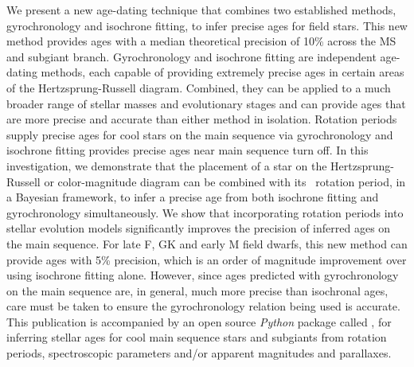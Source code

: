 We present a new age-dating technique that combines two established methods,
gyrochronology and isochrone fitting, to infer precise ages for field stars.
This new method provides ages with a median theoretical precision of 10\%
across the MS and subgiant branch.
Gyrochronology and isochrone fitting are independent age-dating methods, each
capable of providing extremely precise ages in certain areas of the
Hertzsprung-Russell diagram.
Combined, they can be applied to a much broader range of stellar masses and
evolutionary stages and can provide ages that are more precise and accurate
than either method in isolation.
Rotation periods supply precise ages for cool stars on the main sequence via
gyrochronology and isochrone fitting provides precise ages near main sequence
turn off.
In this investigation, we demonstrate that the placement of a star on the
Hertzsprung-Russell or color-magnitude diagram
can be combined with its \kepler\ rotation period, in a Bayesian framework, to
infer a precise age from both isochrone fitting and gyrochronology
simultaneously.
We show that incorporating rotation periods into stellar evolution models
significantly improves the precision of inferred ages on the main sequence.
For late F, GK and early M field dwarfs, this new method can provide ages with
5\% precision, which is an order of magnitude improvement over using isochrone
fitting alone.
However, since ages predicted with gyrochronology on the main sequence are, in
general, much more precise than isochronal ages, care must be taken to ensure
the gyrochronology relation being used is accurate.
This publication is accompanied by an open source {\it Python} package called
\sd, for inferring stellar ages for cool main sequence stars and subgiants
from rotation periods, spectroscopic parameters and/or apparent magnitudes and
parallaxes.
